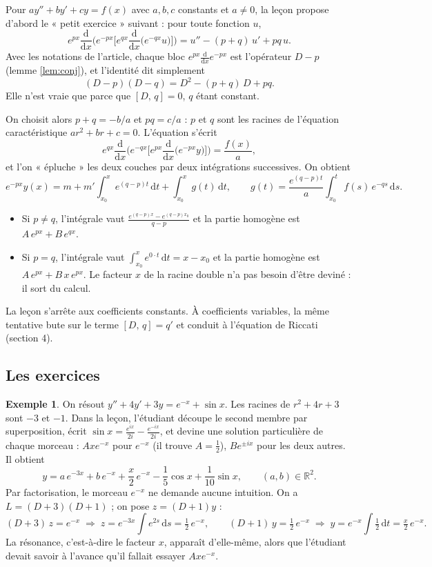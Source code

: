 \documentclass[11pt,a4paper]{article}
\theoremstyle{plain}
\theoremstyle{definition}
\newtheorem{exemple}[theoreme]{Exemple}
\theoremstyle{remark}
\newcommand{\R}{\mathbb{R}}
\newcommand{\Dx}{D}
\newcommand{\cro}[2]{\left[#1,\,#2\right]}
\newcommand{\dd}{\mathrm{d}}
\begin{document}
Pour $ay'' + by' + cy = f(x)$ avec $a, b, c$ constants et $a \neq 0$, la leçon propose d'abord le « petit exercice » suivant : pour toute fonction $u$,
\[
  e^{px}\frac{\dd}{\dd x}\Big(e^{-px}\Big[e^{qx}\frac{\dd}{\dd x}\big(e^{-qx}u\big)\Big]\Big)
  = u'' - (p+q)\,u' + pq\,u .
\]
Avec les notations de l'article, chaque bloc $e^{px}\frac{\dd}{\dd x}e^{-px}$ est l'opérateur $\Dx - p$ (lemme \ref{lem:conj}), et l'identité dit simplement
\[
  (\Dx - p)(\Dx - q) = \Dx^2 - (p+q)\,\Dx + pq .
\]
Elle n'est vraie que parce que $\cro{\Dx}{q} = 0$, $q$ étant constant.

On choisit alors $p + q = -b/a$ et $pq = c/a$ : $p$ et $q$ sont les racines de l'équation caractéristique $ar^2 + br + c = 0$. L'équation s'écrit
\[
  e^{qx}\frac{\dd}{\dd x}\Big(e^{-qx}\Big[e^{px}\frac{\dd}{\dd x}\big(e^{-px}y\big)\Big]\Big) = \frac{f(x)}{a},
\]
et l'on « épluche » les deux couches par deux intégrations successives. On obtient
\[
  e^{-px}y(x) = m + m'\!\int_{x_0}^{x} e^{(q-p)t}\,\dd t + \int_{x_0}^{x} g(t)\,\dd t,
  \qquad g(t) = \frac{e^{(q-p)t}}{a}\int_{x_0}^{t} f(s)\,e^{-qs}\,\dd s .
\]
\begin{itemize}[nosep]
\item Si $p \neq q$, l'intégrale vaut $\frac{e^{(q-p)x} - e^{(q-p)x_0}}{q-p}$ et la partie homogène est $A\,e^{px} + B\,e^{qx}$.
\item Si $p = q$, l'intégrale vaut $\int_{x_0}^{x} e^{0\cdot t}\,\dd t = x - x_0$ et la partie homogène est $A\,e^{px} + B\,x\,e^{px}$. Le facteur $x$ de la racine double n'a pas besoin d'être deviné : il sort du calcul.
\end{itemize}

La leçon s'arrête aux coefficients constants. À coefficients variables, la même tentative bute sur le terme $\cro{\Dx}{q} = q'$ et conduit à l'équation de Riccati (section 4).

\subsection{Les exercices}

\begin{exemple}
On résout $y'' + 4y' + 3y = e^{-x} + \sin x$. Les racines de $r^2 + 4r + 3$ sont $-3$ et $-1$. Dans la leçon, l'étudiant découpe le second membre par superposition, écrit $\sin x = \frac{e^{ix}}{2i} - \frac{e^{-ix}}{2i}$, et devine une solution particulière de chaque morceau : $Axe^{-x}$ pour $e^{-x}$ (il trouve $A = \frac12$), $Be^{\pm ix}$ pour les deux autres. Il obtient
\[
  y = a\,e^{-3x} + b\,e^{-x} + \frac{x}{2}\,e^{-x} - \frac15\cos x + \frac1{10}\sin x,
  \qquad (a,b) \in \R^2 .
\]
Par factorisation, le morceau $e^{-x}$ ne demande aucune intuition. On a $L = (\Dx + 3)(\Dx + 1)$ ; on pose $z = (\Dx + 1)y$ :
\[
  (\Dx + 3)\,z = e^{-x} \;\Longrightarrow\; z = e^{-3x}\!\int e^{2s}\,\dd s = \tfrac12\,e^{-x},
  \qquad
  (\Dx + 1)\,y = \tfrac12\,e^{-x} \;\Longrightarrow\; y = e^{-x}\!\int \tfrac12\,\dd t = \tfrac{x}{2}\,e^{-x}.
\]
La résonance, c'est-à-dire le facteur $x$, apparaît d'elle-même, alors que l'étudiant devait savoir à l'avance qu'il fallait essayer $Axe^{-x}$.
\end{exemple}
\end{document}
